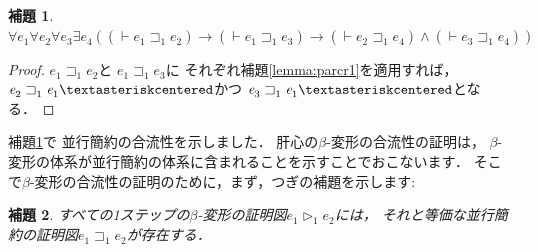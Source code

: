 \documentclass{ltjsbook}%
\newtheorem{lemma}{補題}[section]%
\newcommand\lemmaname{補題}%
\begin{document}
\begin{lemma}%
  \label{lemma:parcr}%
  $\forall\mathit{e}_1^{}\forall\mathit{e}_2^{}\forall\mathit{e}_3^{}\exists\mathit{e}_4^{}%
  ((\vdash\mathit{e}_1^{}\sqsupset_1^{}\mathit{e}_2^{})\rightarrow%
  (\vdash\mathit{e}_1^{}\sqsupset_1^{}\mathit{e}_3^{})\rightarrow%
  (\vdash\mathit{e}_2^{}\sqsupset_1^{}\mathit{e}_4^{})\land%
  (\vdash\mathit{e}_3^{}\sqsupset_1^{}\mathit{e}_4^{}))$%
\end{lemma}%
\begin{proof}%
  $\mathit{e}_1^{}\sqsupset_1^{}\mathit{e}_2^{}$と%
  $\mathit{e}_1^{}\sqsupset_1^{}\mathit{e}_3^{}$に%
  それぞれ\lemmaname\ref{lemma:parcr1}を適用すれば，%
  $\mathit{e}_2^{}\sqsupset_1^{}\mathit{e}_1^{}\textasteriskcentered$かつ%
  $\mathit{e}_3^{}\sqsupset_1^{}\mathit{e}_1^{}\textasteriskcentered$となる．%
\end{proof}%
\par\lemmaname\ref{lemma:parcr}で%
並行簡約の合流性を示しました．%
肝心の$\beta$-変形の合流性の証明は，%
$\beta$-変形の体系が並行簡約の体系に含まれることを示すことでおこないます．%
そこで$\beta$-変形の合流性の証明のために，まず，つぎの補題を示します:%
\begin{lemma}%
  \label{lemma:betapar}%
  すべての1ステップの$\beta$-変形の証明図$\mathit{e}_1^{}\triangleright_1^{}\mathit{e}_2^{}$には，%
  それと等価な並行簡約の証明図$\mathit{e}_1^{}\sqsupset_1^{}\mathit{e}_2^{}$が存在する．%
\end{lemma}%
\end{document}

